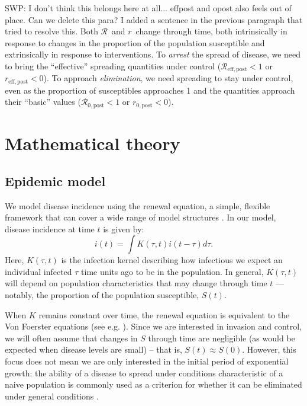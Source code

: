 \documentclass[12pt]{article}
\newcommand{\RR}{\ensuremath{{\mathcal R}}}
\newcommand{\Rx}[1]{\ensuremath{\RR_{\mathrm{#1}}}}
\newcommand{\Ropost}{\Rx{0,post}}
\newcommand{\Reffpost}{\Rx{eff,post}}
\newcommand{\rr}{\ensuremath{{r}}}
\newcommand{\rx}[1]{\ensuremath{\rr_{\mathrm{#1}}}}
\newcommand{\ropost}{\rx{0,post}}
\newcommand{\reffpost}{\rx{eff,post}}
\begin{document}
SWP: I don't think this belongs here at all... effpost and opost also feels out of place. Can we delete this para? I added a sentence in the previous paragraph that tried to resolve this.
Both \RR\ and \rr\ change through time, both intrinsically in response to changes in the proportion of the population susceptible and extrinsically in response to interventions. To \emph{arrest} the spread of disease, we need to bring the ``effective'' spreading quantities under control ($\Reffpost<1$ or $\reffpost<0$). To approach \emph{elimination}, we need spreading to stay under control, even as the proportion of susceptibles approaches 1 and the quantities approach their ``basic'' values ($\Ropost<1$ or $\ropost<0$).

\section{Mathematical theory}

\subsection{Epidemic model}

We model disease incidence using the renewal equation, a simple, flexible framework that can cover a wide range of model structures \citep{heesterbeek1996concept, diekmann2000mathematical, roberts2004modelling, aldis2005integral, wallinga2007generation, roberts2007model, Champredon2018equivalence}.
In our model, disease incidence at time $t$ is given by:
\begin{equation}
i(t) = \int K(\tau, t) i(t-\tau) d\tau.
\end{equation}
Here, $K(\tau, t)$ is the infection kernel describing how infectious we expect an individual infected $\tau$ time units ago to be in the population.
In general, $K(\tau, t)$ will depend on population characteristics that may change through time $t$ --- notably, the proportion of the population susceptible, $S(t)$.

When $K$ remains constant over time, the renewal equation is equivalent to the Von Foerster equations (see e.g. \cite{fraser2004factors}).
Since we are interested in invasion and control, we will often assume that changes in $S$ through time are negligible (as would be expected when disease levels are small) -- that is, $S(t) \approx S(0)$.
However, this focus does not mean we are only interested in the initial period of exponential growth: the ability of a disease to spread under conditions characteristic of a naive population is commonly used as a criterion for whether it can be eliminated under general conditions \citep{anderson1985vaccination,fraser2004factors}.
\end{document}
